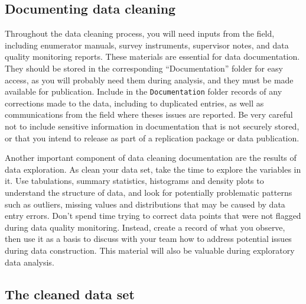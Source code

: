 \subsection{Documenting data cleaning}

Throughout the data cleaning process, you will need inputs from the field, 
including enumerator manuals, survey instruments, 
supervisor notes, and data quality monitoring reports.
These materials are essential for data documentation.
They should be stored in the corresponding ``Documentation'' folder for easy access, 
as you will probably need them during analysis,
and they must be made available for publication.
Include in the \texttt{Documentation} folder records of any
corrections made to the data, including to duplicated entries,
as well as communications from the field where theses issues are reported.
Be very careful not to include sensitive information in documentation that is not securely stored, 
or that you intend to release as part of a replication package or data publication.

Another important component of data cleaning documentation are the results of data exploration.
As clean your data set, take the time to explore the variables in it.
Use tabulations, summary statistics, histograms and density plots to understand the structure of data,
and look for potentially problematic patterns such as outliers,
missing values and distributions that may be caused by data entry errors.
Don't spend time trying to correct data points that were not flagged during data quality monitoring.
Instead, create a record of what you observe,
then use it as a basis to discuss with your team how to address potential issues during data construction.
This material will also be valuable during exploratory data analysis.

\subsection{The cleaned data set}

